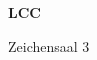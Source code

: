 \documentclass[a4paper]{article}
\begin{document}
\printGenericVSLHeader
\begin{center}
\begin{vsltext}{3cm}{4cm}

   \vspace{0.5cm} 

    \textbf{LCC} 

    \vspace{1.5cm}

    Zeichensaal 3

\end{vsltext}

\end{center}
\end{document}
